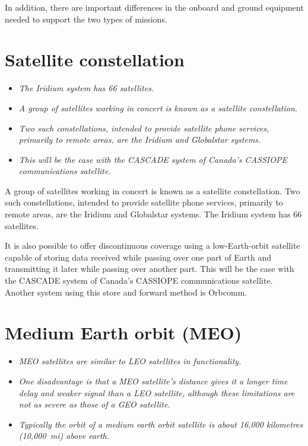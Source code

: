 In addition, there are important differences in the onboard and ground
equipment needed to support the two types of missions.

\section{Satellite constellation}\label{satellite-constellation}

\begin{itemize}
\item
  \emph{The Iridium system has 66 satellites.}
\item
  \emph{A group of satellites working in concert is known as a satellite
  constellation.}
\item
  \emph{Two such constellations, intended to provide satellite phone
  services, primarily to remote areas, are the Iridium and Globalstar
  systems.}
\item
  \emph{This will be the case with the CASCADE system of Canada's
  CASSIOPE communications satellite.}
\end{itemize}

A group of satellites working in concert is known as a satellite
constellation. Two such constellations, intended to provide satellite
phone services, primarily to remote areas, are the Iridium and
Globalstar systems. The Iridium system has 66 satellites.

It is also possible to offer discontinuous coverage using a
low-Earth-orbit satellite capable of storing data received while passing
over one part of Earth and transmitting it later while passing over
another part. This will be the case with the CASCADE system of Canada's
CASSIOPE communications satellite. Another system using this store and
forward method is Orbcomm.

\section{Medium Earth orbit (MEO)}\label{medium-earth-orbit-meo}

\begin{itemize}
\item
  \emph{MEO satellites are similar to LEO satellites in functionality.}
\item
  \emph{One disadvantage is that a MEO satellite's distance gives it a
  longer time delay and weaker signal than a LEO satellite, although
  these limitations are not as severe as those of a GEO satellite.}
\item
  \emph{Typically the orbit of a medium earth orbit satellite is about
  16,000 kilometres (10,000~mi) above earth.}
\end{itemize}

